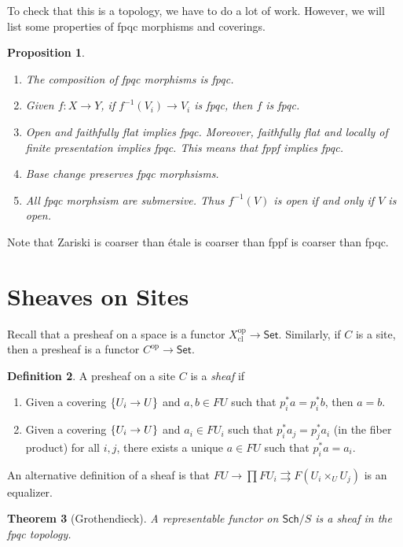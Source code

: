\documentclass[leqno, openany]{memoir}
\newtheorem{thm}{Theorem}[section]
\newtheorem{prop}[thm]{Proposition}
\theoremstyle{definition}
\newtheorem{defn}[thm]{Definition}
\theoremstyle{remark}
\theoremstyle{plain}
\theoremstyle{definition}
\theoremstyle{remark}
\newcommand{\mr}[1]{\mathrm{#1}}
\newcommand{\ms}[1]{\mathsf{#1}}
\begin{document}
To check that this is a topology, we have to do a lot of work. However, we will list some properties of fpqc morphisms and coverings.

\begin{prop}
    \begin{enumerate}
        \item The composition of fpqc morphisms is fpqc.
        \item Given $f \colon X \to Y$, if $f^{-1}(V_i) \to V_i$ is fpqc, then $f$ is fpqc.
        \item Open and faithfully flat implies fpqc. Moreover, faithfully flat and locally of finite presentation implies fpqc. This means that fppf implies fpqc.
        \item Base change preserves fpqc morphsisms.
        \item All fpqc morphsism are submersive. Thus $f^{-1}(V)$ is open if and only if $V$ is open.
    \end{enumerate}
\end{prop}

Note that Zariski is coarser than \'etale is coarser than fppf is coarser than fpqc.

\section{Sheaves on Sites}%
\label{sec:sheaves_on_sites}

Recall that a presheaf on a space is a functor $X_{\mr{cl}}^{\mr{op}} \to \ms{Set}$. Similarly, if $C$ is a site, then a presheaf is a functor $C^{\mr{op}} \to \ms{Set}$.

\begin{defn}
    A presheaf on a site $C$ is a \textit{sheaf} if
    \begin{enumerate}
        \item Given a covering $\qty{U_i \to U}$ and $a,b \in FU$ such that $p_i^*a = p_i^*b$, then $a = b$.
        \item Given a covering $\qty{U_i \to U}$ and $a_i \in FU_i$ such that $p_i^* a_j = p_j^* a_i$ (in the fiber product) for all $i,j$, there exists a unique $a \in FU$ such that $p_i^* a = a_i$.
    \end{enumerate}
\end{defn}

An alternative definition of a sheaf is that $FU \to \prod F U_i \rightrightarrows F(U_i \times_U U_j)$ is an equalizer.

\begin{thm}[Grothendieck]
    A representable functor on $\ms{Sch}/S$ is a sheaf in the fpqc topology.
\end{thm}
\end{document}
